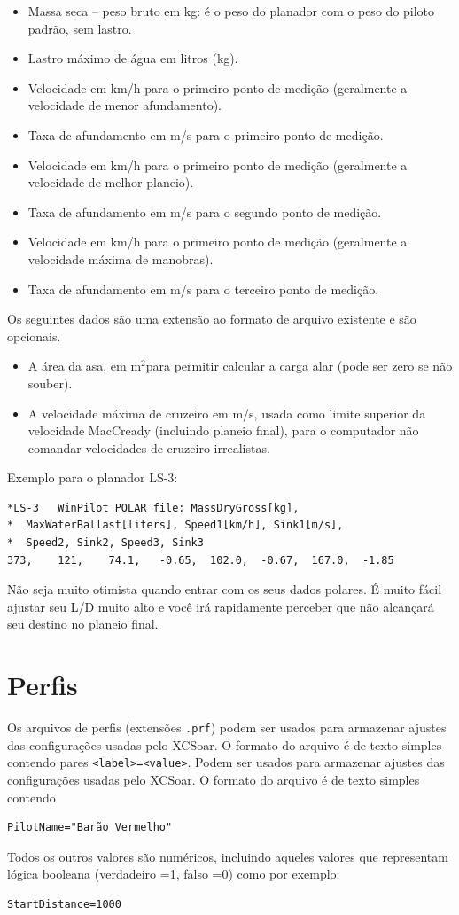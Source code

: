 \begin{itemize}
\item Massa seca – peso bruto em kg:  é o peso do planador com o peso do piloto padrão, sem lastro.
\item Lastro máximo de água em litros (kg).
\item Velocidade em km/h para o primeiro ponto de medição (geralmente a velocidade de menor afundamento).
\item Taxa de afundamento em m/s para o primeiro ponto de medição.
\item Velocidade em km/h para o primeiro ponto de medição (geralmente a velocidade de melhor planeio).
\item Taxa de afundamento em m/s para o segundo ponto de medição.
\item Velocidade em km/h para o primeiro ponto de medição (geralmente a velocidade máxima de manobras).
\item Taxa de afundamento em m/s para o terceiro ponto de medição.
\end{itemize}
Os seguintes dados são uma extensão ao formato de arquivo existente e são opcionais.
\begin{itemize}
\item A área da asa, em m$^2$para permitir calcular a carga alar (pode ser zero se não souber).
\item A velocidade máxima de cruzeiro em m/s, usada como limite superior
  da velocidade MacCready (incluindo planeio final), para o computador não
  comandar velocidades de cruzeiro irrealistas.
\end{itemize}

Exemplo para o planador LS-3:
\begin{verbatim}
*LS-3	WinPilot POLAR file: MassDryGross[kg], 
*  MaxWaterBallast[liters], Speed1[km/h], Sink1[m/s], 
*  Speed2, Sink2, Speed3, Sink3  	
373,	121,	74.1,	-0.65,	102.0,	-0.67,	167.0,	-1.85
\end{verbatim}

\tip Não seja muito otimista quando entrar com os seus dados polares.  É muito fácil ajustar seu L/D muito alto e você irá rapidamente perceber que não alcançará seu destino no planeio final.

\section{Perfis}

Os arquivos de perfis (extensões \verb|.prf|) podem ser usados para armazenar ajustes das configurações usadas pelo XCSoar.  O formato do arquivo é de texto simples contendo pares \verb|<label>=<value>|.  Podem ser usados para armazenar ajustes das configurações usadas pelo XCSoar.  O formato do arquivo é de texto simples contendo
\begin{verbatim}
PilotName="Barão Vermelho"
\end{verbatim}
Todos os outros valores são numéricos, incluindo aqueles valores que representam lógica booleana (verdadeiro =1, falso =0) como por exemplo:
\begin{verbatim}
StartDistance=1000
\end{verbatim}


